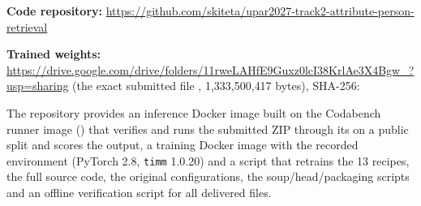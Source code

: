 \documentclass[a4paper, 10pt, conference]{ieeeconf}
\begin{document}
\textbf{Code repository:} \url{https://github.com/skiteta/upar2027-track2-attribute-person-retrieval}

\textbf{Trained weights:} \url{https://drive.google.com/drive/folders/11rweLAHfE9Guxz0lcI38KrlAe3X4Bgw_?usp=sharing} (the exact submitted file , 1{,}333{,}500{,}417 bytes), SHA-256:\par
\noindent{}

The repository provides an inference Docker image built on the Codabench runner image () that verifies and runs the submitted ZIP through its  on a public split and scores the output, a training Docker image with the recorded environment (PyTorch 2.8, \texttt{timm} 1.0.20) and a script that retrains the 13 recipes, the full source code, the original configurations, the soup/head/packaging scripts and an offline verification script for all delivered files.



\end{document}
